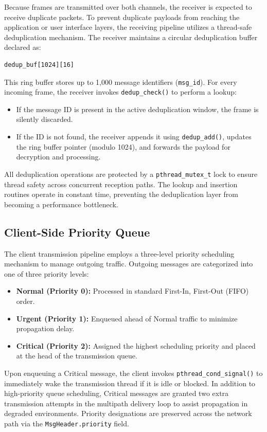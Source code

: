 \documentclass[conference]{IEEEtran}
\begin{document}
Because frames are transmitted over both channels, the receiver is expected to receive duplicate packets. To prevent duplicate payloads from reaching the application or user interface layers, the receiving pipeline utilizes a thread-safe deduplication mechanism. The receiver maintains a circular deduplication buffer declared as:
\begin{verbatim}
dedup_buf[1024][16]
\end{verbatim}
This ring buffer stores up to 1,000 message identifiers (\texttt{msg\_id}). For every incoming frame, the receiver invokes \texttt{dedup\_check()} to perform a lookup:
\begin{itemize}
    \item If the message ID is present in the active deduplication window, the frame is silently discarded.
    \item If the ID is not found, the receiver appends it using \texttt{dedup\_add()}, updates the ring buffer pointer (modulo 1024), and forwards the payload for decryption and processing.
\end{itemize}
All deduplication operations are protected by a \texttt{pthread\_mutex\_t} lock to ensure thread safety across concurrent reception paths. The lookup and insertion routines operate in constant time, preventing the deduplication layer from becoming a performance bottleneck.

\subsection{Client-Side Priority Queue}

The client transmission pipeline employs a three-level priority scheduling mechanism to manage outgoing traffic. Outgoing messages are categorized into one of three priority levels:
\begin{itemize}
    \item \textbf{Normal (Priority 0):} Processed in standard First-In, First-Out (FIFO) order.
    \item \textbf{Urgent (Priority 1):} Enqueued ahead of Normal traffic to minimize propagation delay.
    \item \textbf{Critical (Priority 2):} Assigned the highest scheduling priority and placed at the head of the transmission queue.
\end{itemize}

Upon enqueuing a Critical message, the client invokes \texttt{pthread\_cond\_signal()} to immediately wake the transmission thread if it is idle or blocked. In addition to high-priority queue scheduling, Critical messages are granted two extra transmission attempts in the multipath delivery loop to assist propagation in degraded environments. Priority designations are preserved across the network path via the \texttt{MsgHeader.priority} field.
\end{document}
